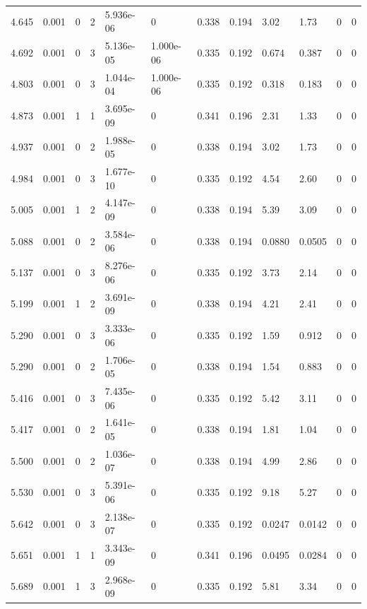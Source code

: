 \documentclass[preview]{standalone}
\begin{document}
{{{\begin{tabular}{L{1.2cm}C{1.2cm} C{0.3cm}C{0.5cm} C{1.4cm}C{1.4cm} C{1.4cm}C{1.4cm} C{1.6cm}C{1.6cm} C{1.6cm}C{1.6cm}}
  4.645  &  0.001  & 0     &  2 &  5.936e-06  & 0  &  0.338&   0.194& 3.02 & 1.73   &  0 & 0  \\ 
  4.692  &  0.001  & 0     &  3 &  5.136e-05  & 1.000e-06  &  0.335&   0.192& 0.674 & 0.387   &  0 & 0  \\ 
  4.803  &  0.001  & 0     &  3 &  1.044e-04  & 1.000e-06  &  0.335&   0.192& 0.318 & 0.183   &  0 & 0  \\ 
  4.873  &  0.001  & 1     &  1 &  3.695e-09  & 0  &  0.341&   0.196& 2.31 & 1.33   &  0 & 0  \\ 
  4.937  &  0.001  & 0     &  2 &  1.988e-05  & 0  &  0.338&   0.194& 3.02 & 1.73   &  0 & 0  \\ 
  4.984  &  0.001  & 0     &  3 &  1.677e-10  & 0  &  0.335&   0.192& 4.54 & 2.60   &  0 & 0  \\ 
  5.005  &  0.001  & 1     &  2 &  4.147e-09  & 0  &  0.338&   0.194& 5.39 & 3.09   &  0 & 0  \\ 
  5.088  &  0.001  & 0     &  2 &  3.584e-06  & 0  &  0.338&   0.194& 0.0880 & 0.0505   &  0 & 0  \\ 
  5.137  &  0.001  & 0     &  3 &  8.276e-06  & 0  &  0.335&   0.192& 3.73 & 2.14   &  0 & 0  \\ 
  5.199  &  0.001  & 1     &  2 &  3.691e-09  & 0  &  0.338&   0.194& 4.21 & 2.41   &  0 & 0  \\ 
  5.290  &  0.001  & 0     &  3 &  3.333e-06  & 0  &  0.335&   0.192& 1.59 & 0.912   &  0 & 0  \\ 
  5.290  &  0.001  & 0     &  2 &  1.706e-05  & 0  &  0.338&   0.194& 1.54 & 0.883   &  0 & 0  \\ 
  5.416  &  0.001  & 0     &  3 &  7.435e-06  & 0  &  0.335&   0.192& 5.42 & 3.11   &  0 & 0  \\ 
  5.417  &  0.001  & 0     &  2 &  1.641e-05  & 0  &  0.338&   0.194& 1.81 & 1.04   &  0 & 0  \\ 
  5.500  &  0.001  & 0     &  2 &  1.036e-07  & 0  &  0.338&   0.194& 4.99 & 2.86   &  0 & 0  \\ 
  5.530  &  0.001  & 0     &  3 &  5.391e-06  & 0  &  0.335&   0.192& 9.18 & 5.27   &  0 & 0  \\ 
  5.642  &  0.001  & 0     &  3 &  2.138e-07  & 0  &  0.335&   0.192& 0.0247 & 0.0142   &  0 & 0  \\ 
  5.651  &  0.001  & 1     &  1 &  3.343e-09  & 0  &  0.341&   0.196& 0.0495 & 0.0284   &  0 & 0  \\ 
  5.689  &  0.001  & 1     &  3 &  2.968e-09  & 0  &  0.335&   0.192& 5.81 & 3.34   &  0 & 0  \\ 

\end{tabular}}}}
\end{document}
